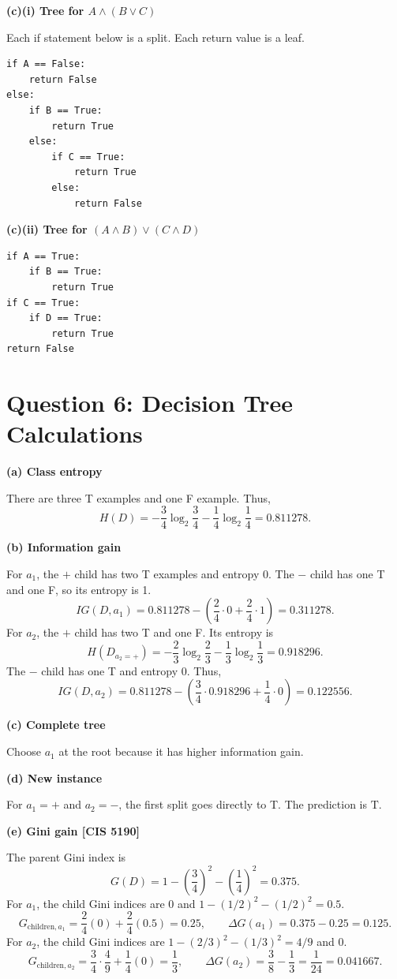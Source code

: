 \documentclass[11pt]{article}
\newcommand{\parttitle}[1]{\par\textbf{#1}\par}
\begin{document}
\parttitle{(c)(i) Tree for $A\land(B\lor C)$}
Each if statement below is a split. Each return value is a leaf.
\begin{verbatim}
if A == False:
    return False
else:
    if B == True:
        return True
    else:
        if C == True:
            return True
        else:
            return False
\end{verbatim}
\parttitle{(c)(ii) Tree for $(A\land B)\lor(C\land D)$}
\begin{verbatim}
if A == True:
    if B == True:
        return True
if C == True:
    if D == True:
        return True
return False
\end{verbatim}

\newpage
\section*{Question 6: Decision Tree Calculations}
\parttitle{(a) Class entropy}
There are three T examples and one F example. Thus,
\[
H(D)=-\frac34\log_2\frac34-\frac14\log_2\frac14
=\boxed{0.811278}.
\]
\parttitle{(b) Information gain}
For $a_1$, the $+$ child has two T examples and entropy 0. The $-$ child has one T and one F, so its entropy is 1.
\[
IG(D,a_1)=0.811278-\left(\frac24\cdot0+\frac24\cdot1\right)
=\boxed{0.311278}.
\]
For $a_2$, the $+$ child has two T and one F. Its entropy is
\[
H(D_{a_2=+})=-\frac23\log_2\frac23-\frac13\log_2\frac13=0.918296.
\]
The $-$ child has one T and entropy 0. Thus,
\[
IG(D,a_2)=0.811278-\left(\frac34\cdot0.918296+\frac14\cdot0\right)
=\boxed{0.122556}.
\]
\parttitle{(c) Complete tree}
Choose $a_1$ at the root because it has higher information gain.
\begin{center}
\end{center}
\parttitle{(d) New instance}
For $a_1=+$ and $a_2=-$, the first split goes directly to T. The prediction is $\boxed{\mathrm{T}}$.

\parttitle{(e) Gini gain [CIS 5190]}
The parent Gini index is
\[
G(D)=1-\left(\frac34\right)^2-\left(\frac14\right)^2=0.375.
\]
For $a_1$, the child Gini indices are $0$ and $1-(1/2)^2-(1/2)^2=0.5$.
\[
G_{\text{children},a_1}=\frac24(0)+\frac24(0.5)=0.25,
\qquad \Delta G(a_1)=0.375-0.25=\boxed{0.125}.
\]
For $a_2$, the child Gini indices are $1-(2/3)^2-(1/3)^2=4/9$ and $0$.
\[
G_{\text{children},a_2}=\frac34\cdot\frac49+\frac14(0)=\frac13,
\qquad \Delta G(a_2)=\frac38-\frac13=\frac1{24}=\boxed{0.041667}.
\]
\end{document}
